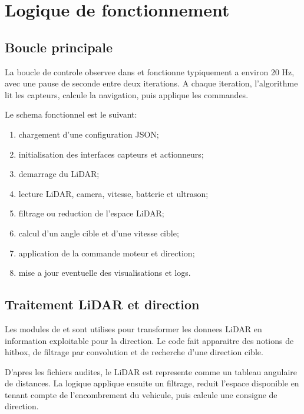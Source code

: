 \section{Logique de fonctionnement}

\subsection{Boucle principale}

La boucle de controle observee dans  et  fonctionne typiquement a environ 20 Hz, avec une pause de  seconde entre deux iterations. A chaque iteration, l'algorithme lit les capteurs, calcule la navigation, puis applique les commandes.

Le schema fonctionnel est le suivant:

\begin{enumerate}
  \item chargement d'une configuration JSON;
  \item initialisation des interfaces capteurs et actionneurs;
  \item demarrage du LiDAR;
  \item lecture LiDAR, camera, vitesse, batterie et ultrason;
  \item filtrage ou reduction de l'espace LiDAR;
  \item calcul d'un angle cible et d'une vitesse cible;
  \item application de la commande moteur et direction;
  \item mise a jour eventuelle des visualisations et logs.
\end{enumerate}

\subsection{Traitement LiDAR et direction}

Les modules de  et  sont utilises pour transformer les donnees LiDAR en information exploitable pour la direction. Le code fait apparaitre des notions de hitbox, de filtrage par convolution et de recherche d'une direction cible.

D'apres les fichiers audites, le LiDAR est represente comme un tableau angulaire de distances. La logique applique ensuite un filtrage, reduit l'espace disponible en tenant compte de l'encombrement du vehicule, puis calcule une consigne de direction.

